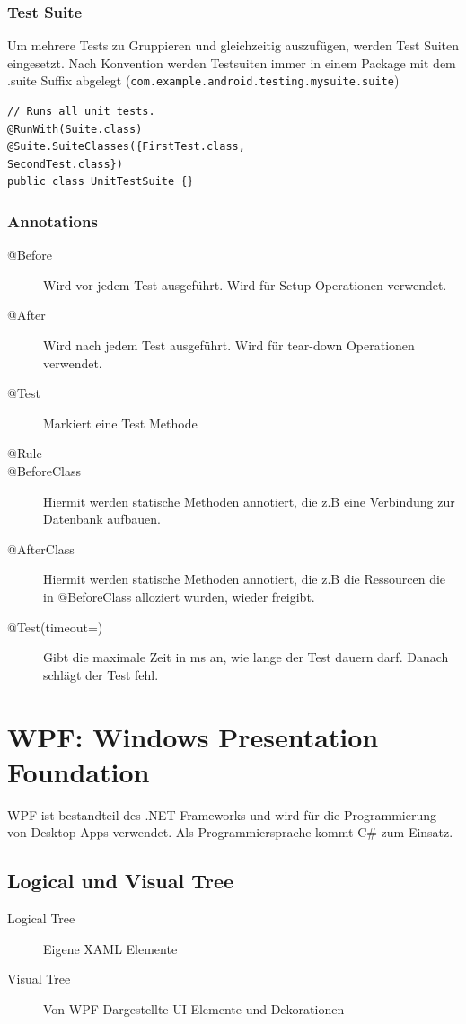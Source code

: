 \subsubsection{Test Suite}
Um mehrere Tests zu Gruppieren und gleichzeitig auszufügen, werden Test Suiten eingesetzt. Nach Konvention werden Testsuiten immer in einem Package mit dem .suite Suffix abgelegt (\lstinline|com.example.android.testing.mysuite.suite|)
\begin{lstlisting}[caption=Andorid JUnit 4 Test Suite]
// Runs all unit tests.
@RunWith(Suite.class)
@Suite.SuiteClasses({FirstTest.class,
SecondTest.class})
public class UnitTestSuite {}
\end{lstlisting}

\subsubsection{Annotations}
\begin{description}
	\item[@Before] Wird vor jedem Test ausgeführt. Wird für Setup Operationen verwendet.
	\item[@After] Wird nach jedem Test ausgeführt. Wird für tear-down Operationen verwendet.
	\item[@Test] Markiert eine Test Methode
	\item[@Rule] %
	\item[@BeforeClass] Hiermit werden statische Methoden annotiert, die z.B eine Verbindung zur Datenbank aufbauen.
	\item[@AfterClass] Hiermit werden statische Methoden annotiert, die z.B die Ressourcen die in @BeforeClass alloziert wurden, wieder freigibt. 
	\item[@Test(timeout=)] Gibt die maximale Zeit in ms an, wie lange der Test dauern darf. Danach schlägt der Test fehl.
\end{description}

\section{WPF: Windows Presentation Foundation}
WPF ist bestandteil des .NET Frameworks und wird für die Programmierung von Desktop Apps verwendet. Als Programmiersprache kommt C\# zum Einsatz.

\subsection{Logical und Visual Tree}
\begin{description}
	\item[Logical Tree] Eigene XAML Elemente
	\item[Visual Tree] Von WPF Dargestellte UI Elemente und Dekorationen
\end{description}

